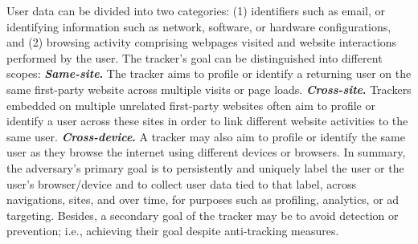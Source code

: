 %
%
User data can be divided into two categories: (1) identifiers such as email, or identifying information such as network, software, or hardware configurations, and (2) browsing activity comprising webpages visited and website interactions performed by the user. 
%
The tracker's goal can be distinguished into different scopes:
%
\textbf{\textit{Same-site}.} 
The tracker aims to profile or identify a returning user on the same first-party website across multiple visits or page loads. 
%
\textbf{\textit{Cross-site}.} 
%
Trackers embedded on multiple unrelated first-party websites often aim to profile or identify a user across these sites in order to link different website activities to the same user.
%
\textbf{\textit{Cross-device}.} 
%
A tracker may also aim to profile or identify the same user as they browse the internet using different devices or browsers. 
%
%
In summary, the adversary's primary goal is to persistently and uniquely label the user or the user’s browser/device and to collect user data tied to that label, across navigations, sites, and over time, for purposes such as profiling, analytics, or ad targeting.
%
Besides, a secondary goal of the tracker may be to avoid detection or prevention; i.e., achieving their goal despite anti-tracking measures.


